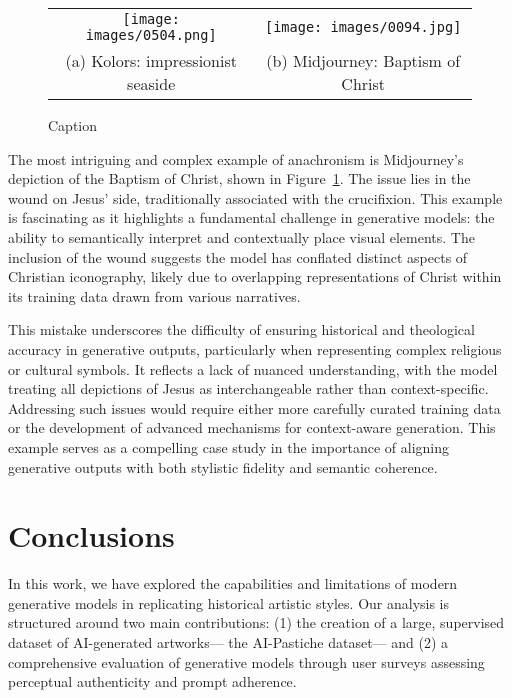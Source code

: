 \documentclass[sn-mathphys]{sn-jnl}
\begin{document}
\begin{figure}[h]
    \centering
    {\footnotesize
    \begin{tabular}{cc}

          \texttt{[image: images/0504.png]}\hspace{.5cm} &  \hspace{.5cm}\texttt{[image: images/0094.jpg]} \\
          (a) Kolors: impressionist seaside & 
          (b) Midjourney: Baptism of Christ
    \end{tabular}
    }
    \caption{Caption}
    \label{fig:anachronisms2}
\end{figure}

The most intriguing and complex example of anachronism is Midjourney's depiction of the Baptism of Christ, shown in 
Figure~\ref{fig:anachronisms2}. The issue lies in the wound on Jesus' side, traditionally associated with the crucifixion.
This example is fascinating as it highlights a fundamental challenge in generative models: the ability to semantically interpret and contextually place visual elements. The inclusion of the wound suggests the model has conflated distinct aspects of Christian iconography, likely due to overlapping representations of Christ within its training data drawn from various narratives.

This mistake underscores the difficulty of ensuring historical and theological accuracy in generative outputs, particularly when representing complex religious or cultural symbols. It reflects a lack of nuanced understanding, with the model treating all depictions of Jesus as interchangeable rather than context-specific. Addressing such issues would require either more carefully curated training data or the development of advanced mechanisms for context-aware generation. This example serves as a compelling case study in the importance of aligning generative outputs with both stylistic fidelity and semantic coherence.


\section{Conclusions}
\label{sec:conclusions}
In this work, we have explored the capabilities and limitations of modern generative models in replicating historical artistic styles. Our analysis is structured around two main contributions: (1) the creation of a large, supervised dataset of AI-generated artworks— the AI-Pastiche dataset— and (2) a comprehensive evaluation of generative models through user surveys assessing perceptual authenticity and prompt adherence.
\end{document}
